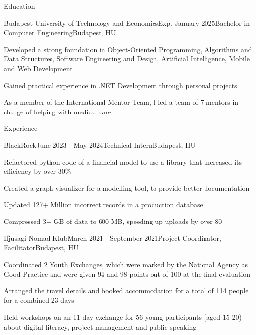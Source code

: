 \documentclass[
	a4paper, %
	11pt, %
]{resume} %
\begin{document}

\begin{rSection}{Education}

	\begin{rSubsection}{Budapest University of Technology and Economics}{Exp. January 2025}{Bachelor in Computer Engineering}{Budapest, HU}
		\item Developed a strong foundation in Object-Oriented Programming, Algorithms and Data Structures, Software Engineering and Design, Artificial Intelligence, Mobile and Web Development
		\item Gained practical experience in .NET Development through personal projects
		\item As a member of the International Mentor Team, I led a team of 7 mentors in charge of helping with medical care
	\end{rSubsection}

\end{rSection}


\begin{rSection}{Experience}

	\begin{rSubsection}{BlackRock}{June 2023 - May 2024}{Technical Intern}{Budapest, HU}
		\item Refactored python code of a financial model to use a library that increased its efficiency by over 30\%
		\item Created a graph visualizer for a modelling tool, to provide better documentation
		\item Updated 127+ Million incorrect records in a production database
		\item Compressed 3+ GB of data to 600 MB, speeding up uploads by over 80%
	\end{rSubsection}

	\begin{rSubsection}{Ifjusagi Nomad Klub}{March 2021 - September 2021}{Project Coordinator, Facilitator}{Budapest, HU}
		\item Coordinated 2 Youth Exchanges, which were marked by the National Agency as Good Practice and were given 94 and 98 points out of 100 at the final evaluation
		\item Arranged the travel details and booked accommodation for a total of 114 people for a combined 23 days
		\item Held workshops on an 11-day exchange for 56 young participants (aged 15-20) about digital literacy, project management and public speaking
	\end{rSubsection}

\end{rSection}
\end{document}
